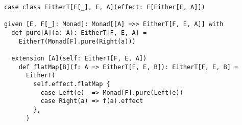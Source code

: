 \begin{algorithm}

\begin{verbatim}
case class EitherT[F[_], E, A](effect: F[Either[E, A]])

given [E, F[_]: Monad]: Monad[[A] =>> EitherT[F, E, A]] with
  def pure[A](a: A): EitherT[F, E, A] =
    EitherT(Monad[F].pure(Right(a)))

  extension [A](self: EitherT[F, E, A])
    def flatMap[B](f: A => EitherT[F, E, B]): EitherT[F, E, B] =
      EitherT(
        self.effect.flatMap {
          case Left(e)  => Monad[F].pure(Left(e))
          case Right(a) => f(a).effect
        },
      )
\end{verbatim}

\caption{EitherT monad transformer in Scala. %
\label{monadtransformer:either-t}}
\end{algorithm}